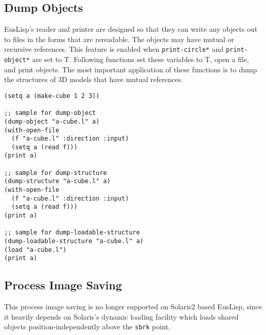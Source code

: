 \newpage

\subsection{Dump Objects}
EusLisp's reader and printer are designed so that they can write any
objects out to files in the forms that are rereadable.
The objects may have mutual or recursive references.
This feature is enabled when {\tt *print-circle*} and {\tt *print-object*}
are set to T.
Following functions set these variables to T, open a file, and
print objects.
The most important application of these functions is to dump the
structures of 3D models that have mutual references.

\begin{refdesc}




\end{refdesc}

\begin{verbatim}
(setq a (make-cube 1 2 3))

;; sample for dump-object
(dump-object "a-cube.l" a)
(with-open-file
  (f "a-cube.l" :direction :input)
  (setq a (read f)))
(print a)

;; sample for dump-structure
(dump-structure "a-cube.l" a)
(with-open-file
  (f "a-cube.l" :direction :input)
  (setq a (read f)))
(print a)

;; sample for dump-loadable-structure
(dump-loadable-structure "a-cube.l" a)
(load "a-cube.l")
(print a)
\end{verbatim}

\subsection{Process Image Saving}
This process image saving is no longer supported on Solaris2 based
EusLisp, since it heavily depends on Solaris's dynamic loading facility
which loads shared objects position-independently above the {\tt sbrk}
point.


